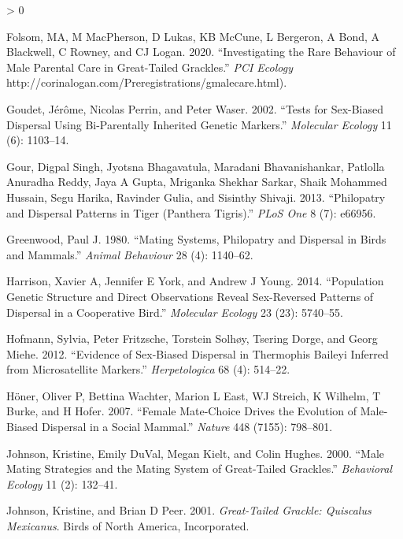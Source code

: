 \documentclass[
]{article}
\newlength{\cslhangindent}
\newenvironment{CSLReferences}[2] %
 {%
  \setlength{\parindent}{0pt}
  \ifodd #1 \everypar{\setlength{\hangindent}{\cslhangindent}}\ignorespaces\fi
  \ifnum #2 > 0
  \setlength{\parskip}{#2\baselineskip}
  \fi
 }%
 {}
\begin{document}
\begin{CSLReferences}{1}{0}
\leavevmode\hypertarget{ref-Folsom2020malecare}{}%
Folsom, MA, M MacPherson, D Lukas, KB McCune, L Bergeron, A Bond, A
Blackwell, C Rowney, and CJ Logan. 2020. {``Investigating the Rare
Behaviour of Male Parental Care in Great-Tailed Grackles.''} \emph{PCI
Ecology} http://corinalogan.com/Preregistrations/gmalecare.html).

\leavevmode\hypertarget{ref-goudet2002tests}{}%
Goudet, Jérôme, Nicolas Perrin, and Peter Waser. 2002. {``Tests for
Sex-Biased Dispersal Using Bi-Parentally Inherited Genetic Markers.''}
\emph{Molecular Ecology} 11 (6): 1103--14.

\leavevmode\hypertarget{ref-gour2013philopatry}{}%
Gour, Digpal Singh, Jyotsna Bhagavatula, Maradani Bhavanishankar,
Patlolla Anuradha Reddy, Jaya A Gupta, Mriganka Shekhar Sarkar, Shaik
Mohammed Hussain, Segu Harika, Ravinder Gulia, and Sisinthy Shivaji.
2013. {``Philopatry and Dispersal Patterns in Tiger (Panthera
Tigris).''} \emph{PLoS One} 8 (7): e66956.

\leavevmode\hypertarget{ref-greenwood1980mating}{}%
Greenwood, Paul J. 1980. {``Mating Systems, Philopatry and Dispersal in
Birds and Mammals.''} \emph{Animal Behaviour} 28 (4): 1140--62.

\leavevmode\hypertarget{ref-harrison2014population}{}%
Harrison, Xavier A, Jennifer E York, and Andrew J Young. 2014.
{``Population Genetic Structure and Direct Observations Reveal
Sex-Reversed Patterns of Dispersal in a Cooperative Bird.''}
\emph{Molecular Ecology} 23 (23): 5740--55.

\leavevmode\hypertarget{ref-hofmann2012evidence}{}%
Hofmann, Sylvia, Peter Fritzsche, Torstein Solhøy, Tsering Dorge, and
Georg Miehe. 2012. {``Evidence of Sex-Biased Dispersal in Thermophis
Baileyi Inferred from Microsatellite Markers.''} \emph{Herpetologica} 68
(4): 514--22.

\leavevmode\hypertarget{ref-honer2007female}{}%
Höner, Oliver P, Bettina Wachter, Marion L East, WJ Streich, K Wilhelm,
T Burke, and H Hofer. 2007. {``Female Mate-Choice Drives the Evolution
of Male-Biased Dispersal in a Social Mammal.''} \emph{Nature} 448
(7155): 798--801.

\leavevmode\hypertarget{ref-johnson2000male}{}%
Johnson, Kristine, Emily DuVal, Megan Kielt, and Colin Hughes. 2000.
{``Male Mating Strategies and the Mating System of Great-Tailed
Grackles.''} \emph{Behavioral Ecology} 11 (2): 132--41.

\leavevmode\hypertarget{ref-johnson2001great}{}%
Johnson, Kristine, and Brian D Peer. 2001. \emph{Great-Tailed Grackle:
Quiscalus Mexicanus}. Birds of North America, Incorporated.


\end{CSLReferences}
\end{document}
